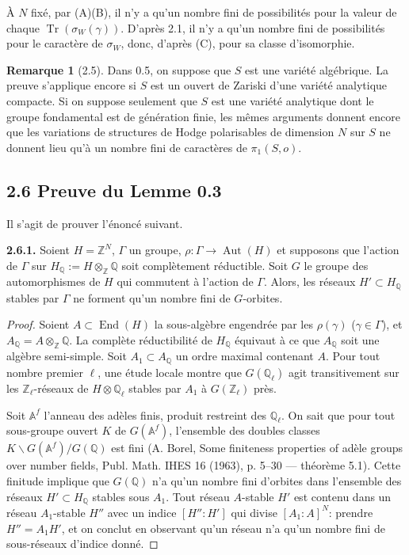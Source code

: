 \documentclass[12pt,a4paper]{article}
\theoremstyle{plain}
\theoremstyle{definition}
\newtheorem{remark}{Remarque}[section]
\DeclareMathOperator{\Tr}{Tr}
\DeclareMathOperator{\End}{End}
\DeclareMathOperator{\Aut}{Aut}
\newcommand{\QQ}{\mathbb{Q}}
\newcommand{\ZZ}{\mathbb{Z}}
\begin{document}
\`{A} $N$ fix\'{e}, par (A)(B), il n'y a qu'un nombre fini de possibilit\'{e}s pour la valeur de chaque $\Tr(\sigma_{W}(\gamma))$. D'apr\`{e}s 2.1, il n'y a qu'un nombre fini de possibilit\'{e}s pour le caract\`{e}re de $\sigma_{W}$, donc, d'apr\`{e}s (C), pour sa classe d'isomorphie.

\begin{remark}[2.5]
Dans 0.5, on suppose que $S$ est une vari\'{e}t\'{e} alg\'{e}brique. La preuve s'applique encore si $S$ est un ouvert de Zariski d'une vari\'{e}t\'{e} analytique compacte. Si on suppose seulement que $S$ est une vari\'{e}t\'{e} analytique dont le groupe fondamental est de g\'{e}n\'{e}ration finie, les m\^{e}mes arguments donnent encore que les variations de structures de Hodge polarisables de dimension $N$ sur $S$ ne donnent lieu qu'\`{a} un nombre fini de caract\`{e}res de $\pi_{1}(S,o)$.
\end{remark}

\subsection*{2.6 Preuve du Lemme 0.3}
Il s'agit de prouver l'\'{e}nonc\'{e} suivant.

\textbf{2.6.1.} Soient $H = \ZZ^{N}$, $\Gamma$ un groupe, $\rho : \Gamma \to \Aut(H)$ et supposons que l'action de $\Gamma$ sur $H_{\QQ} := H \otimes_{\ZZ} \QQ$ soit compl\`{e}tement r\'{e}ductible. Soit $G$ le groupe des automorphismes de $H$ qui commutent \`{a} l'action de $\Gamma$. Alors, les r\'{e}seaux $H' \subset H_{\QQ}$ stables par $\Gamma$ ne forment qu'un nombre fini de $G$-orbites.

\begin{proof}
Soient $A \subset \End(H)$ la sous-alg\`{e}bre engendr\'{e}e par les $\rho(\gamma)$ ($\gamma \in \Gamma$), et $A_{\QQ} = A \otimes_{\ZZ} \QQ$. La compl\`{e}te r\'{e}ductibilit\'{e} de $H_{\QQ}$ \'{e}quivaut \`{a} ce que $A_{\QQ}$ soit une alg\`{e}bre semi-simple. Soit $A_{1} \subset A_{\QQ}$ un ordre maximal contenant $A$. Pour tout nombre premier $\ell$, une \'{e}tude locale montre que $G(\QQ_{\ell})$ agit transitivement sur les $\ZZ_{\ell}$-r\'{e}seaux de $H \otimes \QQ_{\ell}$ stables par $A_{1}$ \`{a} $G(\ZZ_{\ell})$ pr\`{e}s.

Soit $\mathbb{A}^{f}$ l'anneau des ad\`{e}les finis, produit restreint des $\QQ_{\ell}$. On sait que pour tout sous-groupe ouvert $K$ de $G(\mathbb{A}^{f})$, l'ensemble des doubles classes $K \backslash G(\mathbb{A}^{f}) / G(\QQ)$ est fini (A. Borel, Some finiteness properties of ad\`{e}le groups over number fields, Publ. Math. IHES 16 (1963), p. 5--30 --- th\'{e}or\`{e}me 5.1). Cette finitude implique que $G(\QQ)$ n'a qu'un nombre fini d'orbites dans l'ensemble des r\'{e}seaux $H' \subset H_{\QQ}$ stables sous $A_{1}$. Tout r\'{e}seau $A$-stable $H'$ est contenu dans un r\'{e}seau $A_{1}$-stable $H''$ avec un indice $[H'':H']$ qui divise $[A_{1}:A]^{N}$: prendre $H'' = A_{1}H'$, et on conclut en observant qu'un r\'{e}seau n'a qu'un nombre fini de sous-r\'{e}seaux d'indice donn\'{e}.
\end{proof}
\end{document}
